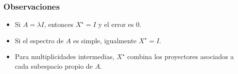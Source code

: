 \subsubsection{Observaciones}
\begin{itemize}
  \item Si $A=\lambda I$, entonces $X^{\star}=I$ y el error es $0$.
  \item Si el espectro de $A$ es simple, igualmente $X^{\star}=I$.
  \item Para multiplicidades intermedias, $X^{\star}$ combina los
        proyectores asociados a cada subespacio propio de $A$.
\end{itemize}
